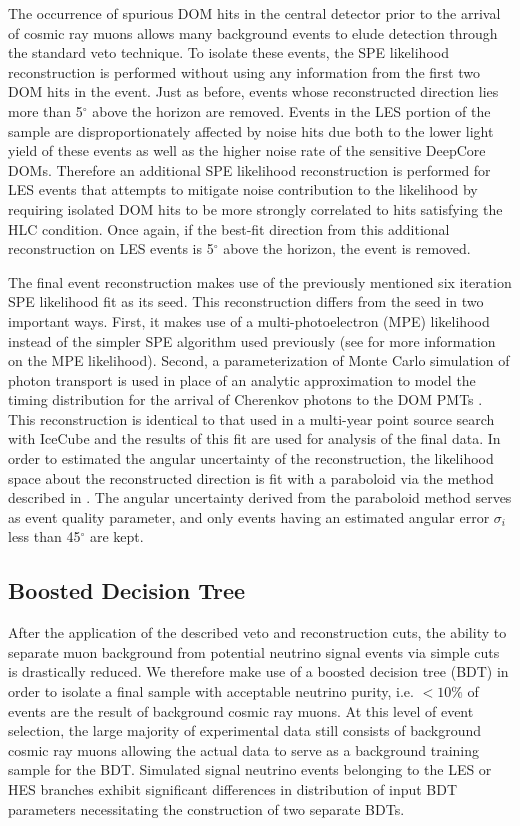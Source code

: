 \documentclass[manuscript]{aastex}
\begin{document}
The occurrence of spurious DOM hits in the central detector prior to the arrival of cosmic ray muons allows many background events to elude detection through the standard veto technique. To isolate these events, the SPE likelihood reconstruction is performed without using any information from the first two DOM hits in the event. Just as before, events whose reconstructed direction lies more than 5$^{\circ}$ above the horizon are removed. Events in the LES portion of the sample are disproportionately affected by noise hits due both to the lower light yield of these events as well as the higher noise rate of the sensitive DeepCore DOMs. Therefore an additional SPE likelihood reconstruction is performed for LES events that attempts to mitigate noise contribution to the likelihood by requiring isolated DOM hits to be more strongly correlated to hits satisfying the HLC condition. Once again, if the best-fit direction from this additional reconstruction on LES events is 5$^{\circ}$ above the horizon, the event is removed.

The final event reconstruction makes use of the previously mentioned six iteration SPE likelihood fit as its seed. This reconstruction differs from the seed in two important ways. First, it makes use of a multi-photoelectron (MPE) likelihood instead of the simpler SPE algorithm used previously (see \cite{2004NIMPA.524..169A} for more information on the MPE likelihood). Second, a parameterization of Monte Carlo simulation of photon transport is used in place of an analytic approximation to model the timing distribution for the arrival of Cherenkov photons to the DOM PMTs \citep{2013CoPhC.184.2214W}. This reconstruction is identical to that used in a multi-year point source search with IceCube \citep{} and the results of this fit are used for analysis of the final data. In order to estimated the angular uncertainty of the reconstruction, the likelihood space about the reconstructed direction is fit with a paraboloid via the method described in \cite{2006APh....25..220N}. The angular uncertainty derived from the paraboloid method serves as event quality parameter, and only events having an estimated angular error $\sigma_i$ less than 45$^{\circ}$ are kept.
 
\subsection{Boosted Decision Tree}
After the application of the described veto and reconstruction cuts, the ability to separate muon background from potential neutrino signal events via simple cuts is drastically reduced. We therefore make use of a boosted decision tree (BDT) in order to isolate a final sample with acceptable neutrino purity, i.e. $<10 \%$ of events are the result of background cosmic ray muons. At this level of event selection, the large majority of experimental data still consists of background cosmic ray muons allowing the actual data to serve as a background training sample for the BDT. Simulated signal neutrino events belonging to the LES or HES branches exhibit significant differences in distribution of input BDT parameters necessitating the construction of two separate BDTs. 
\end{document}
